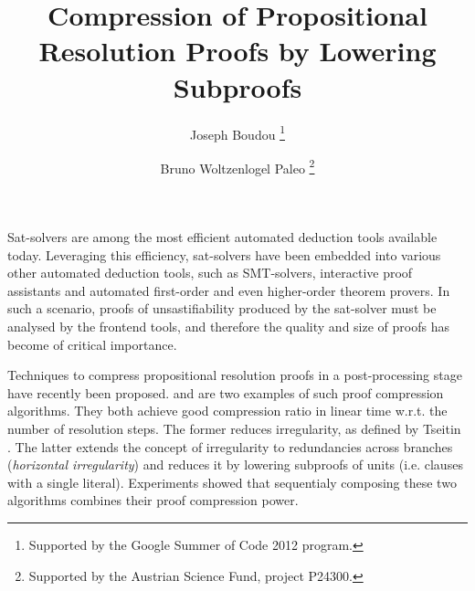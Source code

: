 \documentclass{easychair}
\title{Compression of Propositional Resolution Proofs by Lowering Subproofs}
\author{
  Joseph Boudou\inst{1}
  \thanks{Supported by the Google Summer of Code 2012 program.}
  \and 
  Bruno Woltzenlogel Paleo\inst{2}
  \thanks{Supported by the Austrian Science Fund, project P24300.}
}
\institute{
  Universit\'e Paul Sabatier, Toulouse \\
  \email{joseph.boudou@matabio.net}
  \and 
  Vienna University of Technology \\
  \email{bruno@logic.at}
}
\begin{document}
\maketitle

Sat-solvers are among the most efficient automated deduction tools available today.
Leveraging this efficiency, sat-solvers have been embedded
into various other automated deduction tools,
such as SMT-solvers, interactive proof assistants and automated first-order
and even higher-order theorem provers.
In such a scenario, proofs of unsastifiability produced by the sat-solver must be analysed by the frontend tools, and therefore the quality and
size of proofs has become of critical importance.



Techniques to compress propositional resolution proofs in a post-processing stage have recently been
proposed.
\RecyclePivotsIntersection and \LowerUnits \cite{LURPI} are two examples of such proof
compression algorithms. They both achieve good compression ratio in linear time w.r.t. the number of
resolution steps. The former reduces irregularity, as defined by Tseitin \cite{Tseitin}. The
latter extends the concept of irregularity to redundancies across branches (\emph{horizontal irregularity}) and reduces it
 by lowering subproofs of units (i.e. clauses with a single literal).
Experiments showed \cite{LURPI} that sequentialy composing these two algorithms combines their proof compression power.
\end{document}
